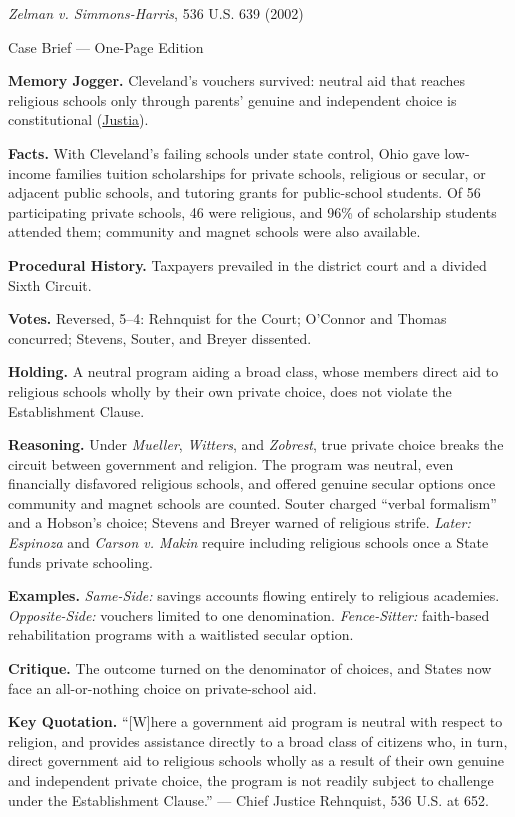 \documentclass[12pt]{article}
\begin{document}
\begin{center}
{\Large \textit{Zelman v. Simmons-Harris}, 536 U.S. 639 (2002)\par}
\vspace{0.3em}
{\normalsize Case Brief --- One-Page Edition\par}
\end{center}

\textbf{Memory Jogger.} Cleveland's vouchers survived: neutral aid that reaches religious schools only through parents' genuine and independent choice is constitutional (\href{https://supreme.justia.com/cases/federal/us/536/639/}{Justia}).

\textbf{Facts.} With Cleveland's failing schools under state control, Ohio gave low-income families tuition scholarships for private schools, religious or secular, or adjacent public schools, and tutoring grants for public-school students. Of 56 participating private schools, 46 were religious, and 96\% of scholarship students attended them; community and magnet schools were also available.

\textbf{Procedural History.} Taxpayers prevailed in the district court and a divided Sixth Circuit.

\textbf{Votes.} Reversed, 5--4: Rehnquist for the Court; O'Connor and Thomas concurred; Stevens, Souter, and Breyer dissented.

\textbf{Holding.} A neutral program aiding a broad class, whose members direct aid to religious schools wholly by their own private choice, does not violate the Establishment Clause.

\textbf{Reasoning.} Under \textit{Mueller}, \textit{Witters}, and \textit{Zobrest}, true private choice breaks the circuit between government and religion. The program was neutral, even financially disfavored religious schools, and offered genuine secular options once community and magnet schools are counted. Souter charged ``verbal formalism'' and a Hobson's choice; Stevens and Breyer warned of religious strife. \emph{Later:} \textit{Espinoza} and \textit{Carson v. Makin} require including religious schools once a State funds private schooling.

\textbf{Examples.} \emph{Same-Side:} savings accounts flowing entirely to religious academies. \emph{Opposite-Side:} vouchers limited to one denomination. \emph{Fence-Sitter:} faith-based rehabilitation programs with a waitlisted secular option.

\textbf{Critique.} The outcome turned on the denominator of choices, and States now face an all-or-nothing choice on private-school aid.

\textbf{Key Quotation.} ``[W]here a government aid program is neutral with respect to religion, and provides assistance directly to a broad class of citizens who, in turn, direct government aid to religious schools wholly as a result of their own genuine and independent private choice, the program is not readily subject to challenge under the Establishment Clause.'' --- Chief Justice Rehnquist, 536 U.S. at 652.
\end{document}
